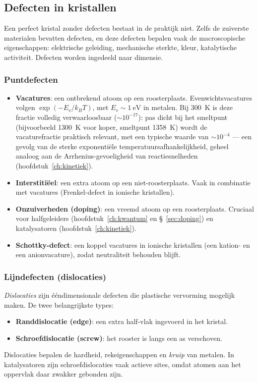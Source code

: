 \subsection{Defecten in kristallen}
\label{sec:defecten}

Een perfect kristal zonder defecten bestaat in de praktijk niet. Zelfs de zuiverste materialen bevatten defecten, en deze defecten bepalen vaak de macroscopische eigenschappen: elektrische geleiding, mechanische sterkte, kleur, katalytische activiteit. Defecten worden ingedeeld naar dimensie.

\subsubsection{Puntdefecten}

\begin{itemize}
\item \textbf{Vacatures}: een ontbrekend atoom op een roosterplaats. Evenwichtsvacatures volgen $\exp(-E_v/k_BT)$, met $E_v \sim \SI{1}{\electronvolt}$ in metalen. Bij \SI{300}{\kelvin} is deze fractie volledig verwaarloosbaar ($\sim10^{-17}$): pas dicht bij het smeltpunt (bijvoorbeeld \SI{1300}{\kelvin} voor koper, smeltpunt \SI{1358}{\kelvin}) wordt de vacaturefractie praktisch relevant, met een typische waarde van $\sim10^{-4}$ --- een gevolg van de sterke exponenti\"ele temperatuursafhankelijkheid, geheel analoog aan de Arrhenius-gevoeligheid van reactiesnelheden (hoofdstuk~\ref{ch:kinetiek}).
\item \textbf{Interstiti\"eel}: een extra atoom op een niet-roosterplaats. Vaak in combinatie met vacatures (Frenkel-defect in ionische kristallen).
\item \textbf{Onzuiverheden (doping)}: een vreemd atoom op een roosterplaats. Cruciaal voor halfgeleiders (hoofdstuk~\ref{ch:kwantum} en \S~\ref{sec:doping}) en katalysatoren (hoofdstuk~\ref{ch:kinetiek}).
\item \textbf{Schottky-defect}: een koppel vacatures in ionische kristallen (een kation- en een anionvacature), zodat neutraliteit behouden blijft.
\end{itemize}

\subsubsection{Lijndefecten (dislocaties)}
\label{sec:dislocaties}

\emph{Dislocaties} zijn \'e\'endimensionale defecten die plastische vervorming mogelijk maken. De twee belangrijkste types:
\begin{itemize}
\item \textbf{Randdislocatie (edge)}: een extra half-vlak ingevoerd in het kristal.
\item \textbf{Schroefdislocatie (screw)}: het rooster is langs een as verschoven.
\end{itemize}
Dislocaties bepalen de hardheid, rekeigenschappen en \emph{kruip} van metalen. In katalysatoren zijn schroefdislocaties vaak actieve sites, omdat atomen aan het oppervlak daar zwakker gebonden zijn.

